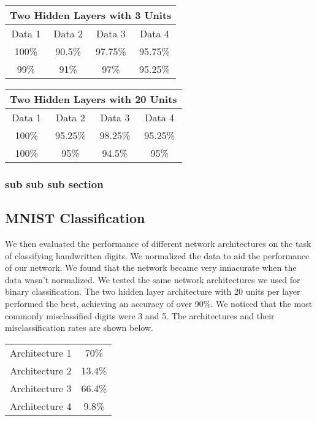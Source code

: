 \documentclass[10pt,twoside]{article}
\begin{document}
\begin{center}
 \begin{tabular}{||c c c c||} 
 \hline
 \multicolumn{4}{|c|}{Two Hidden Layers with 3 Units} \\
 \hline
 \hline
 Data 1 & Data 2 & Data 3 & Data 4 \\ [0.5ex] 
  \hline
 100\% & 90.5\% & 97.75\% & 95.75\% \\
 \hline\hline
 99\% & 91\% & 97\% & 95.25\% \\ 

 \hline
\end{tabular}
\end{center}

\begin{center}
 \begin{tabular}{||c c c c||} 
 \hline
 \multicolumn{4}{|c|}{Two Hidden Layers with 20 Units} \\
 \hline
 \hline
 Data 1 & Data 2 & Data 3 & Data 4 \\ [0.5ex] 
  \hline
 100\% & 95.25\% & 98.25\% & 95.25\% \\
 \hline\hline
 100\% & 95\% & 94.5\% & 95\% \\ 

 \hline
\end{tabular}
\end{center}
\subsubsection{sub sub sub section}


\subsection{MNIST Classification}

We then evaluated the performance of different network architectures on the task of classifying handwritten digits. We normalized the data to aid the performance of our network. We found that the network became very innacurate when the data wasn't normalized. We tested the same network architectures we used for binary classification. The two hidden layer architecture with 20 units per layer performed the best, achieving an accuracy of over 90\%. We noticed that the most commonly misclassified digits were 3 and 5. The architectures and their misclassification rates are shown below. 

\begin{center}
\begin{tabular}{ |c|c| } 
 \hline
 Architecture 1 & 70\% \\ 
 Architecture 2 & 13.4\% \\ 
 Architecture 3 & 66.4\% \\ 
 Architecture 4 & 9.8\% \\ 
 \hline
\end{tabular}
\end{center} 
\end{document}
